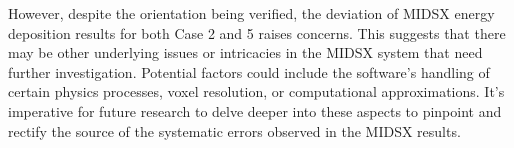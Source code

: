 \par However, despite the orientation being verified, the deviation of MIDSX energy deposition results for both Case 2 and 5 raises concerns. This suggests that there may be other underlying issues or intricacies in the MIDSX system that need further investigation. Potential factors could include the software's handling of certain physics processes, voxel resolution, or computational approximations. It's imperative for future research to delve deeper into these aspects to pinpoint and rectify the source of the systematic errors observed in the MIDSX results.



